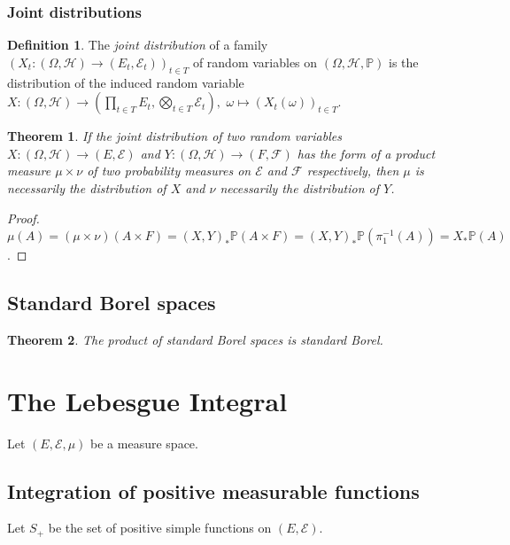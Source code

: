\documentclass[11pt, a4paper, openany]{book}
\newtheorem{thm}{Theorem}\newtheorem{lem}{Lemma}\newtheorem{crl}{Corollary}
\theoremstyle{definition}
\newtheorem{define}{Definition}\newtheorem{exam}{Example}\newtheorem{remark}{Remark}
\begin{document}
\subsection{Joint distributions}
    \begin{define}
        The \textit{joint distribution} of a family $(X_t:(\Omega,\mathscr{H})\rightarrow (E_t,\mathscr{E}_t))_{t\in T}$ of random variables on $(\Omega,\mathscr{H},\mathbb{P})$ is the distribution of the induced random variable $X:(\Omega,\mathscr{H})\rightarrow (\prod_{t\in T}E_t,\bigotimes_{t\in T}\mathscr{E}_t),\,\,\omega\mapsto (X_t(\omega))_{t\in T}$.
    \end{define}
    \begin{thm}
        If the joint distribution of two random variables $X:(\Omega,\mathscr{H})\rightarrow (E,\mathscr{E})$ and $Y:(\Omega,\mathscr{H})\rightarrow (F,\mathscr{F})$ has the form of a product measure $\mu\times\nu$ of two probability measures on $\mathscr{E}$ and $\mathscr{F}$ respectively, then $\mu$ is necessarily the distribution of $X$ and $\nu$ necessarily the distribution of $Y$. 
    \end{thm}
    \begin{proof}
        $\mu(A)=(\mu\times \nu)(A\times F)=(X,Y)_*\mathbb{P}(A\times F)=(X,Y)_*\mathbb{P}(\pi_1^{-1}(A))=X_*\mathbb{P}(A)$.
    \end{proof}
\section{Standard Borel spaces}
    \begin{thm}
        The product of standard Borel spaces is standard Borel.
    \end{thm}
\chapter{The Lebesgue Integral}
    Let $(E,\mathscr{E},\mu)$ be a measure space.
\section{Integration of positive measurable functions}
    Let $S_+$ be the set of positive simple functions on $(E,\mathscr{E})$.
\end{document}
